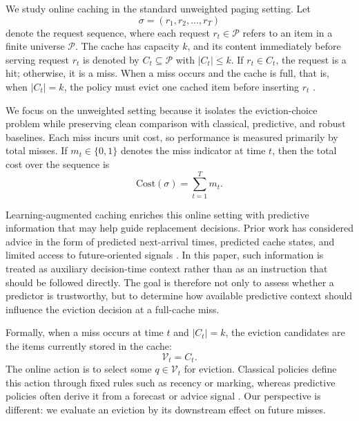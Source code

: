 \documentclass[preprint,12pt]{elsarticle}
\begin{document}
We study online caching in the standard unweighted paging setting. Let
\begin{equation}
\sigma = (r_1, r_2, \ldots, r_T)
\label{eq:req-seq}
\end{equation}
denote the request sequence, where each request $r_t \in \mathcal{P}$ refers to an item in a finite universe $\mathcal{P}$. The cache has capacity $k$, and its content immediately before serving request $r_t$ is denoted by $C_t \subseteq \mathcal{P}$ with $|C_t| \leq k$. If $r_t \in C_t$, the request is a hit; otherwise, it is a miss. When a miss occurs and the cache is full, that is, when $|C_t| = k$, the policy must evict one cached item before inserting $r_t$ \cite{belady1966replacement_algorithms,fiat1991competitive_paging}.

We focus on the unweighted setting because it isolates the eviction-choice problem while preserving clean comparison with classical, predictive, and robust baselines. Each miss incurs unit cost, so performance is measured primarily by total misses. If $m_t \in \{0,1\}$ denotes the miss indicator at time $t$, then the total cost over the sequence is
\begin{equation}
\mathrm{Cost}(\sigma) = \sum_{t=1}^{T} m_t.
\label{eq:total-cost}
\end{equation}

Learning-augmented caching enriches this online setting with predictive information that may help guide replacement decisions. Prior work has considered advice in the form of predicted next-arrival times, predicted cache states, and limited access to future-oriented signals \cite{lykouris2021competitive_caching,antoniadis2020online_metric_untrusted,im2022parsimonious_lac}. In this paper, such information is treated as auxiliary decision-time context rather than as an instruction that should be followed directly. The goal is therefore not only to assess whether a predictor is trustworthy, but to determine how available predictive context should influence the eviction decision at a full-cache miss.

Formally, when a miss occurs at time $t$ and $|C_t| = k$, the eviction candidates are the items currently stored in the cache:
\begin{equation}
\mathcal{V}_t = C_t.
\label{eq:candidate-set}
\end{equation}
The online action is to select some $q \in \mathcal{V}_t$ for eviction. Classical policies define this action through fixed rules such as recency or marking, whereas predictive policies often derive it from a forecast or advice signal \cite{fiat1991competitive_paging,lykouris2021competitive_caching}. Our perspective is different: we evaluate an eviction by its downstream effect on future misses.
\end{document}
